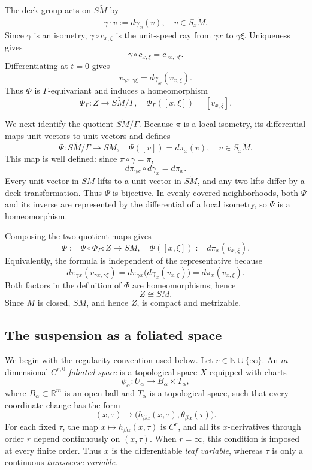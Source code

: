 \documentclass[12pt]{amsart}
\theoremstyle{definition}
\numberwithin{equation}{section}
\newcommand{\wti}{\widetilde}
\begin{document}
The deck group acts on \(S\wti M\) by
\[
  \gamma\cdot v:=d\gamma_x(v),
  \quad v\in S_x\wti M.
\]
Since \(\gamma\) is an isometry, \(\gamma\circ c_{x,\xi}\) is the
unit-speed ray from \(\gamma x\) to \(\gamma\xi\).  Uniqueness gives
\[
  \gamma\circ c_{x,\xi}=c_{\gamma x,\gamma\xi}.
\]
Differentiating at \(t=0\) gives
\[
  v_{\gamma x,\gamma\xi}
  =d\gamma_x(v_{x,\xi}).
\]
Thus \(\Phi\) is \(\Gamma\)-equivariant and induces a homeomorphism
\[
  \Phi_\Gamma\colon
  Z\longrightarrow S\wti M/\Gamma,
  \quad
  \Phi_\Gamma([x,\xi])=[v_{x,\xi}].
\]

We next identify the quotient \(S\wti M/\Gamma\).  Because \(\pi\) is a
local isometry, its differential maps unit vectors to unit vectors and
defines
\[
  \Psi\colon S\wti M/\Gamma\longrightarrow SM,
  \quad
  \Psi([v])=d\pi_x(v),
  \quad v\in S_x\wti M.
\]
This map is well defined: since \(\pi\circ\gamma=\pi\),
\[
  d\pi_{\gamma x}\circ d\gamma_x=d\pi_x.
\]
Every unit vector in \(SM\) lifts to a unit vector in \(S\wti M\), and
any two lifts differ by a deck transformation.  Thus \(\Psi\) is
bijective.  In evenly covered neighborhoods, both \(\Psi\) and its
inverse are represented by the differential of a local isometry, so
\(\Psi\) is a homeomorphism.

Composing the two quotient maps gives
\begin{equation}\label{eq:suspension-unit-tangent}
  \overline\Phi
  :=
  \Psi\circ\Phi_\Gamma
  \colon Z\longrightarrow SM,
  \quad
  \overline\Phi([x,\xi])
  :=
  d\pi_x(v_{x,\xi}).
\end{equation}
Equivalently, the formula is independent of the representative because
\[
  d\pi_{\gamma x}(v_{\gamma x,\gamma\xi})
  =
  d\pi_{\gamma x}\bigl(d\gamma_x(v_{x,\xi})\bigr)
  =
  d\pi_x(v_{x,\xi}).
\]
Both factors in the definition of \(\overline\Phi\) are homeomorphisms;
hence
\[
  Z\cong SM.
\]
Since \(M\) is closed, \(SM\), and hence \(Z\), is compact and metrizable.

\subsection{The suspension as a foliated space}
\label{subsec:suspension-foliated-space}

We begin with the regularity convention used below.  Let
\(r\in\mathbb N\cup\{\infty\}\).  An \(m\)-dimensional
\(C^{r,0}\) \emph{foliated space} is a topological space \(X\) equipped
with charts
\[
  \psi_\alpha\colon U_\alpha\longrightarrow B_\alpha\times T_\alpha,
\]
where \(B_\alpha\subset\mathbb R^m\) is an open ball and \(T_\alpha\) is
a topological space, such that every coordinate change has the form
\[
  (x,\tau)\longmapsto
  \bigl(h_{\beta\alpha}(x,\tau),
        \theta_{\beta\alpha}(\tau)\bigr).
\]
For each fixed \(\tau\), the map
\(x\mapsto h_{\beta\alpha}(x,\tau)\) is \(C^r\), and all its
\(x\)-derivatives through order \(r\) depend continuously on
\((x,\tau)\).  When \(r=\infty\), this condition is imposed at every
finite order.  Thus \(x\) is the differentiable \emph{leaf variable},
whereas \(\tau\) is only a continuous \emph{transverse variable}.
\end{document}
